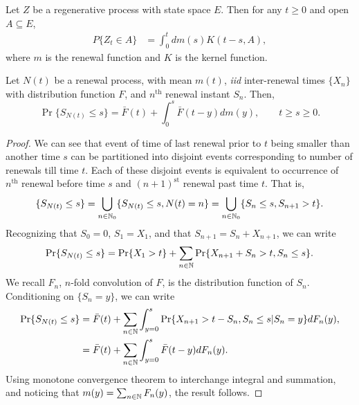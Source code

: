\documentclass[a4paper,10pt,english]{article}
\begin{document}
\begin{prop} 
Let $Z$ be a regenerative process with state space $E$. 
Then for any $t \geq 0$ and open $A \subseteq E$, 
\begin{align*}
P\{Z_t \in A\} &= \int_{0}^tdm(s)K(t-s,A),
\end{align*}
where $m$ is the renewal function and $K$ is the kernel function. 
\end{prop}

\begin{thm} Let $N(t)$ be a renewal process, with mean $m(t)$, \emph{iid} inter-renewal times $\{X_n\}$ with distribution function $F$, and $n^{\mathrm{th}}$ renewal instant $S_n$. Then,
\begin{equation*}
\Pr\{S_{N(t)}\leq s\}=\bar{F}(t)+\int_{0}^{s}\bar{F}(t-y)dm(y),\quad\quad t\geq s \geq 0.
\end{equation*}
\end{thm} 
\begin{proof} We can see that event of time of last renewal prior to $t$ being smaller than another time $s$ can be partitioned into disjoint events corresponding to number of renewals till time $t$. Each of these disjoint events is equivalent to occurrence of $n^{\mathrm{th}}$ renewal before time $s$ and $(n+1)^{\mathrm{st}}$ renewal past time $t$. That is,
\begin{equation*}
	\{S_{N(t)} \leq s\} = \bigcup_{n \in \mathbb{N}_0}\{ S_{N(t)} \leq s, N(t)=n\} = \bigcup_{n \in \mathbb{N}_0}\{ S_n \leq s, S_{n+1} > t\} .
\end{equation*}
Recognizing that $S_0 = 0$, $S_1 = X_1$, and that $S_{n+1} = S_n + X_{n+1}$, we can write
\begin{equation*}
	\Pr\{S_{N(t)} \leq s\} = \Pr\{X_1 > t\} + \sum_{n \in \mathbb{N}}\Pr\{ X_{n+1} + S_n > t, S_n \leq s\} .
\end{equation*}
We recall $F_n$, $n$-fold convolution of $F$, is the distribution function of $S_n$. Conditioning on $\{S_n = y\}$, we can write
\begin{align*}
	\Pr\{S_{N(t)} \leq s\} &= \bar{F}(t) + \sum_{n \in \mathbb{N}}\int_{y=0}^{s}\Pr\{ X_{n+1} > t - S_n, S_n \leq s| S_n = y\}dF_n(y),\\
	&= \bar{F}(t) + \sum_{n \in \mathbb{N}}\int_{y=0}^{s}\bar{F}(t-y)dF_n(y).
\end{align*}
Using monotone convergence theorem to interchange integral and summation, and noticing that $m(y) = \sum_{n\in\mathbb{N}}F_n(y)$, the result follows.
\end{proof}
\end{document}
